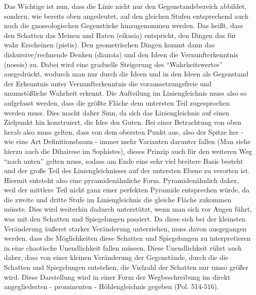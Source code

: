 Das Wichtige ist nun, dass die Linie nicht nur den Gegenstandsbereich abbildet, sondern, wie bereits oben angedeutet, auf den gleichen Stufen entsprechend auch noch die gnoseologischen Gegenstücke hinzugenommen werden. Das heißt, dass den Schatten das Meinen und Raten (eikasia) entspricht, den Dingen das für wahr Erscheinen (pistis). Den geometrischen Dingen kommt dann das diskursive/rechnende Denken (dianoia) und den Ideen die Vernunfterkenntnis (noesis) zu. Dabei wird eine graduelle Steigerung des \enquote{Wahrheitswertes} ausgedrückt, wodurch man nur durch die Ideen und in den Ideen als Gegenstand der Erkenntnis unter Vernunfterkenntnis die voraussetzungsfreie und unumstößliche Wahrheit erkennt. 
Die Aufteilung im Liniengleichnis muss also so aufgefasst werden, dass die größte Fläche dem untersten Teil zugesprochen werden muss. Dies macht daher Sinn, da sich das Liniengleichnis auf einen Zielpunkt hin konstruiert, die Idee des Guten. Bei einer Betrachtung von oben herab also muss gelten, dass von dem obersten Punkt aus, also der Spitze her - wie eine Art Definitionsbaum - immer mehr Varianten darunter fallen (Man siehe hierzu auch die Dihairese im Sophistes), dieses Prinzip auch für den weiteren Weg \enquote{nach unten} gelten muss, sodass am Ende eine sehr viel breitere Basis besteht und der große Teil des Liniengleichnisses auf der untersten Ebene zu verorten ist. Hiermit entsteht also eine pyramidenähnliche Form. Pyramidenähnlich daher, weil der mittlere Teil nicht ganz einer perfekten Pyramide entsprechen würde, da die zweite und dritte Stufe im Liniengleichnis die gleiche Fläche zukommen müsste. Dies wird weiterhin dadurch unterstützt, wenn man sich vor Augen führt, was mit den Schatten und Spiegelungen passiert. Da diese sich bei der kleinsten Veränderung äußerst starker Veränderung unterziehen, muss davon ausgegangen werden, dass die Möglichkeiten diese Schatten und Spiegelungen zu interpretieren in eine chaotische Unendlichkeit fallen müssen. Diese Unendlichkeit rührt auch daher, dass von einer kleinen Veränderung der Gegenstände, durch die die Schatten und Spiegelungen entstehen, die Vielzahl der Schatten nur umso größer wird. Diese Darstellung wird in einer Form der Wegbeschreibung im direkt angegliederten - prominenten - Höhlengleichnis gegeben (Pol. 514-516).\\
